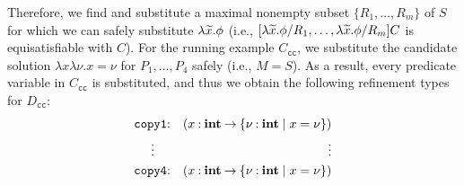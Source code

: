Therefore, we find and substitute a maximal nonempty subset 
\(\{R_1,\dots,R_m\}\) of \(S\) for which we can safely substitute 
\(\lambda\widetilde{x}.\phi\) (i.e., 
\([\lambda\widetilde{x}.\phi/R_1,\dots,\lambda\widetilde{x}.\phi/R_m]C\) is 
equisatisfiable with \(C\)).
%
%
For the running example \(C_{\texttt{cc}}\), we substitute the candidate 
solution \(\lambda x \lambda \nu.x=\nu\) for \(P_1,\dots,P_4\) safely 
(i.e., \(M=S\)).  As a result, every predicate variable in 
\(C_{\texttt{cc}}\) is substituted, and thus we obtain the following 
refinement types for \(D_{\texttt{cc}}\):
\begin{eqnarray*}
\texttt{copy1}&\mathbin{:}&(x\mathbin{:}{\mathbf{int}}\mathbin{\rightarrow}{\{{\nu\mathbin{:}\mathbf{int} \mid x=\nu}\}}) \\
\vdots\quad &&\qquad\qquad \vdots \\
\texttt{copy4}&\mathbin{:}&(x\mathbin{:}{\mathbf{int}}\mathbin{\rightarrow}{\{{\nu\mathbin{:}\mathbf{int} \mid x=\nu}\}})
\end{eqnarray*}


%
